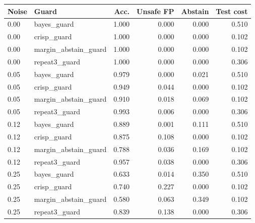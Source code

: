 \begin{tabular}{llrrrr}
\toprule
Noise & Guard & Acc. & Unsafe FP & Abstain & Test cost \\
\midrule
0.00 & bayes\_guard & 1.000 & 0.000 & 0.000 & 0.510 \\
0.00 & crisp\_guard & 1.000 & 0.000 & 0.000 & 0.102 \\
0.00 & margin\_abstain\_guard & 1.000 & 0.000 & 0.000 & 0.102 \\
0.00 & repeat3\_guard & 1.000 & 0.000 & 0.000 & 0.306 \\
0.05 & bayes\_guard & 0.979 & 0.000 & 0.021 & 0.510 \\
0.05 & crisp\_guard & 0.949 & 0.044 & 0.000 & 0.102 \\
0.05 & margin\_abstain\_guard & 0.910 & 0.018 & 0.069 & 0.102 \\
0.05 & repeat3\_guard & 0.993 & 0.006 & 0.000 & 0.306 \\
0.12 & bayes\_guard & 0.889 & 0.001 & 0.111 & 0.510 \\
0.12 & crisp\_guard & 0.875 & 0.108 & 0.000 & 0.102 \\
0.12 & margin\_abstain\_guard & 0.788 & 0.036 & 0.169 & 0.102 \\
0.12 & repeat3\_guard & 0.957 & 0.038 & 0.000 & 0.306 \\
0.25 & bayes\_guard & 0.633 & 0.014 & 0.350 & 0.510 \\
0.25 & crisp\_guard & 0.740 & 0.227 & 0.000 & 0.102 \\
0.25 & margin\_abstain\_guard & 0.580 & 0.063 & 0.349 & 0.102 \\
0.25 & repeat3\_guard & 0.839 & 0.138 & 0.000 & 0.306 \\
\bottomrule
\end{tabular}
